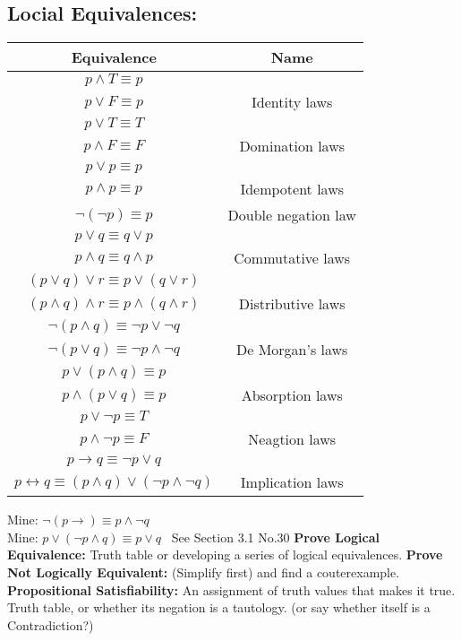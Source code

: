 \documentclass[none,green,normal,cn]{elegantnote}
\begin{document}
\subsection{Locial Equivalences:}
\begin{tabular}{|c|c|}
  \toprule
  Equivalence & Name\\
  \midrule
  \(p \wedge T \equiv p\) & \\
  \(p \vee F \equiv p\) & Identity laws\\
  \midrule
  \(p \vee T \equiv T\) & \\
  \(p \wedge F \equiv F\) & Domination laws\\
  \midrule
  \(p \vee p \equiv p\)& \\
  \(p \wedge p \equiv p\) & Idempotent laws\\
  \midrule
  \(\neg(\neg p) \equiv p\) & Double negation law\\
  \midrule
  \(p \vee q \equiv q \vee p\) & \\
  \(p \wedge q \equiv q \wedge p\) & Commutative laws\\
  \midrule
  \((p \vee q)\vee r \equiv p \vee (q \vee r)\) & \\
  \((p \wedge q)\wedge r \equiv p \wedge (q \wedge r)\) & Distributive laws\\
  \midrule
  \(\neg(p \wedge q) \equiv \neg p \vee \neg q\) & \\
  \(\neg(p \vee q) \equiv \neg p \wedge \neg q\) & De Morgan's laws\\
  \midrule
  \(p \vee (p \wedge q) \equiv p\) & \\
  \(p \wedge (p \vee q) \equiv p\) & Absorption laws\\
  \midrule
  \(p \vee \neg p \equiv T\) & \\
  \(p \wedge \neg p \equiv F\) & Neagtion laws\\
  \midrule
  \(p \rightarrow q \equiv \neg p \vee q\) & \\
  \(p \leftrightarrow q \equiv (p \wedge q) \vee (\neg p \wedge \neg q)\) & Implication laws\\
  \bottomrule
\end{tabular}

Mine: \(\neg(p \rightarrow) \equiv p \wedge \neg q\)\\
Mine: \(p \vee (\neg p \wedge q ) \equiv p \vee q \)  \ See Section 3.1 No.30
\textbf{Prove Logical Equivalence:} Truth table or developing a series of logical equivalences.
\textbf{Prove Not Logically Equivalent:} (Simplify first) and find a couterexample.
\textbf{Propositional Satisfiability:} An assignment of truth values that makes it true.
Truth table, or whether its negation is a tautology. (or say whether itself is a Contradiction?)
\end{document}
